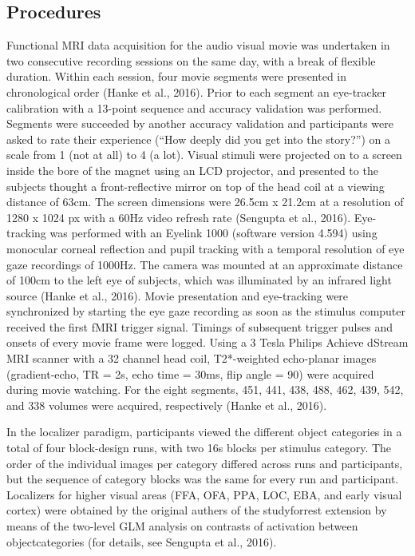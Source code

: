 \documentclass[a4paper, 11pt]{scrreprt}
\begin{document}
\subsection{Procedures}
Functional MRI data acquisition for the audio visual movie was undertaken in two consecutive recording sessions on the same day, with a break of flexible duration. Within each session, four movie segments were presented in chronological order (Hanke et al., 2016).  Prior to each segment an eye-tracker calibration with a 13-point sequence and accuracy validation was performed.
Segments were succeeded by another accuracy validation and participants were asked to rate their experience (“How deeply did you get into the story?”) on a scale from 1 (not at all) to 4 (a lot). Visual stimuli were projected on to a screen inside the bore of the magnet using an LCD projector, and presented to the subjects thought a front-reflective mirror on top of the head
coil at a viewing distance of 63cm. The screen dimensions were 26.5cm x 21.2cm at a resolution of 1280 x 1024 px with a 60Hz video refresh rate (Sengupta et al., 2016). Eye-tracking was performed with an Eyelink 1000 (software version 4.594) using monocular corneal reflection and pupil tracking with a temporal resolution of eye gaze recordings of 1000Hz. The camera was mounted at an approximate distance of 100cm to the left eye of subjects, which was illuminated
by an infrared light source (Hanke et al., 2016). Movie presentation and eye-tracking were synchronized by starting the eye gaze recording as soon as the stimulus computer received the first fMRI trigger signal. Timings of subsequent trigger pulses and onsets of every movie frame
were logged. Using a 3 Tesla Philips Achieve dStream MRI scanner with a 32 channel head coil, T2*-weighted echo-planar images (gradient-echo, TR = 2s, echo time = 30ms, flip angle = 90) were acquired during movie watching. For the eight segments, 451, 441, 438, 488, 462, 439, 542, and 338 volumes were acquired, respectively (Hanke et al., 2016).

In the localizer paradigm, participants viewed the different object categories in a total of four block-design runs, with two 16s blocks per stimulus category. The order of the individual images per category differed across runs and participants, but the sequence of category blocks was the same for every run and participant. Localizers for higher visual areas (FFA, OFA, PPA, LOC, EBA, and early visual cortex) were obtained by the original authers of the studyforrest extension by means of the two-level GLM analysis on contrasts of activation between objectcategories (for details, see Sengupta et al., 2016).
\end{document}
